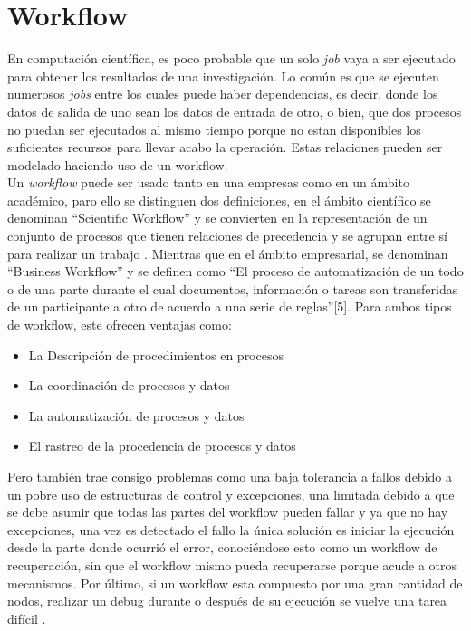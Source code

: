 \section{Workflow}

En computación científica, es poco probable que un solo \emph{job} vaya a ser ejecutado para obtener los resultados de una investigación. Lo común es que se ejecuten numerosos \emph{jobs} entre los cuales puede haber dependencias, es decir, donde los datos de salida de uno sean los datos de entrada de otro, o bien, que dos procesos no puedan ser ejecutados al mismo tiempo porque no estan disponibles los suficientes recursos para llevar acabo la operación. Estas relaciones pueden ser modelado haciendo uso de un workflow.\\

Un \emph{workflow} puede ser usado tanto en una empresas como en un ámbito académico, paro ello se distinguen dos definiciones, en el ámbito científico se denominan “Scientific Workflow” y se convierten en la representación de un conjunto de procesos que tienen relaciones de precedencia y se agrupan entre sí para realizar un trabajo \cite{qin2012scientific}. Mientras que en el ámbito empresarial, se denominan ``Business Workflow'' y se definen como “El proceso de automatización de un todo o de una parte durante el cual documentos, información o tareas son transferidas de un participante a otro de acuerdo a una serie de reglas”[5]. Para ambos tipos de workflow, este ofrecen ventajas como:

\begin{itemize}
\item La Descripción de procedimientos en procesos
\item La coordinación de procesos y datos
\item La automatización de procesos y datos
\item El rastreo de la procedencia de procesos y datos
\end{itemize}

Pero también trae consigo problemas como una baja tolerancia a fallos debido a un pobre uso de estructuras de control y excepciones, una limitada debido a que se debe asumir que todas las partes del workflow pueden fallar y ya que no hay excepciones, una vez es detectado el fallo la única solución es iniciar la ejecución desde la parte donde ocurrió el error, conociéndose esto como un workflow de recuperación, sin que el workflow mismo pueda recuperarse porque acude a otros mecanismos. Por último, si un workflow esta compuesto por una gran cantidad de nodos, realizar un debug durante o después de su ejecución se vuelve una tarea difícil \cite{WorkflowGrid:2006}.\\


